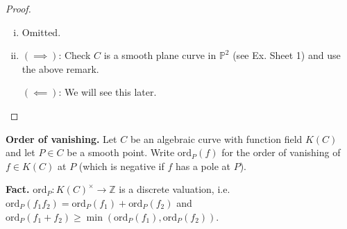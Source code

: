 \documentclass{article}
\theoremstyle{definition}
\begin{document}
\begin{proof}
    \begin{enumerate}[(i)]
        \item Omitted.
        \item $(\implies)$: Check $C$ is a smooth plane curve in $\mathbb{P}^2$ (see Ex. Sheet 1) and use the above remark.
        \vspace{1mm}
         
        $(\impliedby)$: We will see this later.
    \end{enumerate}
\end{proof}

\vspace{1mm}
 
\textbf{Order of vanishing.} Let $C$ be an algebraic curve with function field $K(C)$ and let $P \in C$ be a smooth point. Write $\text{ord}_P(f)$ for the order of vanishing of $f \in K(C)$ at $P$ (which is negative if $f$ has a pole at $P$).
\vspace{1mm}
 
\textbf{Fact.} $\text{ord}_P : K(C)^\times \to \mathbb{Z}$ is a discrete valuation, i.e. $\text{ord}_P(f_1f_2) = \text{ord}_P(f_1) + \text{ord}_P(f_2)$ and $\text{ord}_P(f_1+f_2)\ge \min(\text{ord}_P(f_1),\text{ord}_P(f_2))$. 
\end{document}
